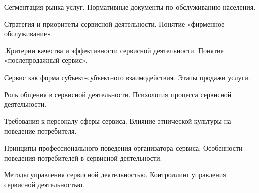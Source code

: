 \documentclass[
	14pt,
	a4paper,
	]
	{scrartcl}
\begin{document}
\newpage


\shapk
{}
\setcounter{zad}{0}

\vfill
\z Сегментация рынка услуг.
 \vfill
\z Нормативные документы по обслуживанию населения.
 \vfill

\vfill

\newpage


\shapk
{}
\setcounter{zad}{0}

\vfill
\z Стратегия и приоритеты сервисной деятельности.
 \vfill
\z Понятие «фирменное обслуживание».
 \vfill

\vfill

\newpage


\shapk
{}
\setcounter{zad}{0}

\vfill
\z .Критерии качества и эффективности сервисной деятельности.
 \vfill
\z Понятие «послепродажный сервис».
 \vfill

\vfill

\newpage


\shapk
{}
\setcounter{zad}{0}

\vfill
\z Сервис как форма субъект-субъектного взаимодействия.
 \vfill
\z Этапы продажи услуги.
 \vfill

\vfill

\newpage


\shapk
{}
\setcounter{zad}{0}

\vfill
\z Роль общения в сервисной деятельности.
 \vfill
\z Психология процесса сервисной деятельности.
 \vfill

\vfill

\newpage


\shapk
{}
\setcounter{zad}{0}

\vfill
\z Требования к персоналу сферы сервиса.
 \vfill
\z Влияние этнической культуры на поведение потребителя.
 \vfill

\vfill

\newpage


\shapk
{}
\setcounter{zad}{0}

\vfill
\z Принципы профессионального поведения организатора сервиса. 
 \vfill
\z Особенности поведения потребителей в сервисной деятельности.
 \vfill

\vfill

\newpage


\shapk
{}
\setcounter{zad}{0}

\vfill
\z Методы управления сервисной деятельностью.
 \vfill
\z Контроллинг управления сервисной деятельностью. 
 \vfill

\vfill

\newpage
\end{document}

